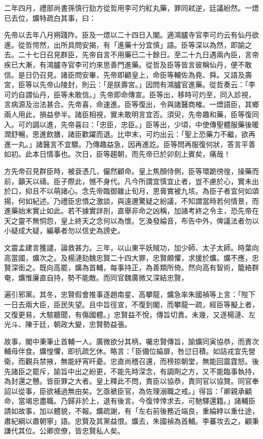 \begin{pinyinscope}
二年四月，禮部尚書孫慎行劾方從哲用李可灼紅丸藥，罪同弒逆，廷議紛然。一燝已去位，爌特疏白其事，曰：

先帝以去年八月朔踐阼。臣及一燝以二十四日入閣。適鴻臚寺官李可灼云有仙丹欲進。從哲愕然，出所具問安揭，有「進藥十分宜慎」語。臣等深以為然，即諭之去。二十七日召見群臣，先帝自言不用藥已二十餘日。至二十九日遇兩內臣，言帝疾已大漸，有鴻臚寺官李可灼來思善門進藥。從哲及臣等皆言彼稱仙丹，便不敢信。是日仍召見。諸臣問安畢，先帝即顧皇上，命臣等輔佐為堯、舜。又語及壽宮，臣等以先帝山陵封，則云：「是朕壽宮。」因問有鴻臚官進藥。從哲奏云：「李可灼自謂仙丹，臣等未敢信。」先帝即命傳宣。臣等出，移時可灼至，同入診視，言病源及治法甚合。先帝喜，命速進。臣等復出，令與諸醫商榷。一燝語臣，其鄉兩人用此，損益參半。諸臣相視，實未敢明言宜否。須臾，先帝趣和藥，臣等復同入。可灼調以進，先帝喜曰：「忠臣，忠臣。」臣等出，少頃，中使傳聖體服藥後暖潤舒暢，思進飲膳，諸臣歡躍而退。比申末，可灼出云：「聖上恐藥力不繼，欲再進一丸。」諸醫言不宜驟。乃傳趣益急，因再進訖。臣等問再服復何狀，答言平善如初。此本日情事也。次日，臣等趨朝，而先帝已於卯刻上賓矣，痛哉！

方先帝召見群臣時，被袞憑几，儼然顧命。皇上焦顏侍側，臣等環跪徬徨，操藥而前，籲天以禱。臣子際此，憾不身代。凡今所謂宜慎宜止者，豈不慮於心，實未出於口，抑且不以萌諸心。念先帝臨御雖止旬月，恩膏實被九垓。為臣子者宜何如頌揚，何如紀述。乃禮臣忠憤之激談，與遠邇驚疑之紛議，不知謂當時若何情景，而進藥始末實止如此。若不據實詳剖，直舉非命之凶稱，加諸考終之令主，恐先帝在天之靈不無恫怨，皇上終天之念何以為懷。乞渙發綸音，布告中外，俾議法者勿以小疑成大疑，編摹者勿以信史為謗史。

文震孟建言獲譴，論救甚力。三年，以山東平妖賊功，加少師、太子太師。時葉向高當國，爌次之。及楊漣劾魏忠賢二十四大罪，忠賢頗懼，求援於爌。爌不應，忠賢深銜之。既向高罷，爌為首輔，每事持正，為善類所倚。然向高有智術，籠絡群奄，爌惟廉直自持，勢不能敵。而同官魏廣微又深結忠賢，

遍引邪黨。其冬，忠賢假會推事逐趙南星、高攀龍，爌急率朱國禎等上言：「陛下一日去兩大臣，臣民失望。且中旨徑宣，不復到閣，而攀龍一疏，經臣等擬上者，又復更易，大駭聽聞，有傷國體。」忠賢益不悅，傳旨切責。未幾，又逐楊漣、左光斗、陳于廷，朝政大變，忠賢勢益張。

故事，閣中秉筆止首輔一人。廣微欲分其柄，囑忠賢傳旨，諭爌同寅協恭，而責次輔毋伴食。爌惶懼，即抗疏乞休。略言：「臣備位綸扉，咎愆日積。如詰戎宜先營衛，而觀兵禁掖，無能紓宵旰憂。忠直尚稽召還，而榜掠朝堂，無能回震霆怒。後先諸臣之罷斥，諭旨中出之紛更，不能先時深念，有調劑之方，又不能臨事執持，為封還之戇。皆臣罪之大者。皇上釋此不問，責臣以協恭，責同官以協贊。同官奉詔以從事，臣欲補過無由矣。乞亟褫臣官，為佐理溺職之戒。」得旨：「卿親承顧命，當竭忠盡職。乃歸非於上，退有後言。今復悻悻求去，可馳驛還籍。」諸輔臣請如故事，加以體貌，不報。爌疏謝，有「左右前後務近端良，重綸綍以重仕途，肅紀綱以肅朝寧」語。忠賢及其黨益恨。爌去，朱國禎為首輔。李蕃攻去之，顧秉謙代其位。公卿庶僚，皆忠賢私人矣。


\end{pinyinscope}
